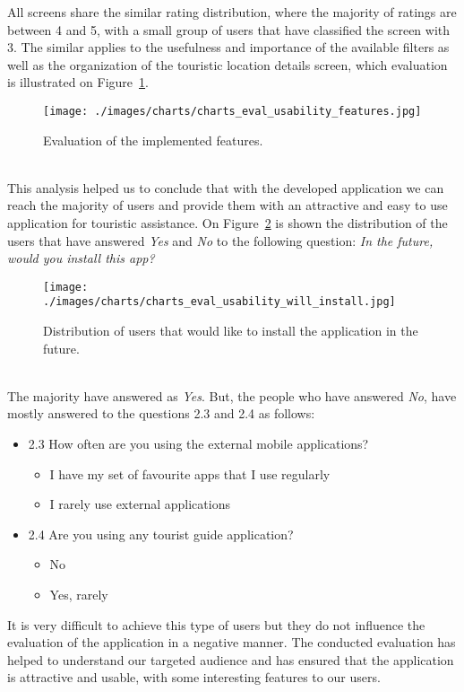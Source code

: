All screens share the similar rating distribution, where the majority of ratings are between 4 and 5, with a small group of users that have classified the screen with 3. The similar applies to the usefulness and importance of the available filters as well as the organization of the touristic location details screen, which evaluation is illustrated on Figure~\ref{fig:usabilityFeatures}.\\
\begin{figure}[h!]
 \centering
   \texttt{[image: ./images/charts/charts\_eval\_usability\_features.jpg]}
   \caption{Evaluation of the implemented features.}
   \label{fig:usabilityFeatures}
\end{figure}\\
This analysis helped us to conclude that with the developed application we can reach the majority of users and provide them with an attractive and easy to use application for touristic assistance. On Figure~\ref{fig:usabilityInstallDistribution} is shown the distribution of the users that have answered \emph{Yes} and \emph{No} to the following question: \emph{In the future, would you install this app?}\\
\begin{figure}[h!]
 \centering
   \texttt{[image: ./images/charts/charts\_eval\_usability\_will\_install.jpg]}
   \caption{Distribution of users that would like to install the application in the future.}
   \label{fig:usabilityInstallDistribution}
\end{figure}\\
The majority have answered as \emph{Yes}. But, the people who have answered \emph{No}, have mostly answered to the questions 2.3 and 2.4 as follows:
\begin{itemize}
\item 2.3 How often are you using the external mobile applications?
	\begin{itemize}
		\item I have my set of favourite apps that I use regularly
		\item I rarely use external applications
	\end{itemize}
\item 2.4 Are you using any tourist guide application? 
\begin{itemize}
	\item No
	\item Yes, rarely
\end{itemize}
\end{itemize}
It is very difficult to achieve this type of users but they do not influence the evaluation of the application in a negative manner. The conducted evaluation has helped to understand our targeted audience and has ensured that the application is attractive and usable, with some interesting features to our users.